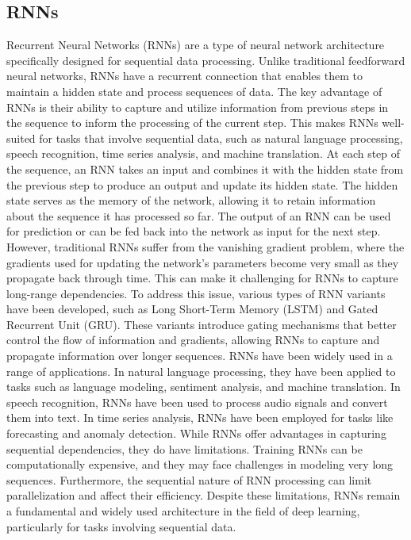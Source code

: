 \subsection{RNNs}
Recurrent Neural Networks (RNNs) are a type of neural network architecture specifically designed for sequential data processing. Unlike traditional feedforward neural networks, RNNs have a recurrent connection that enables them to maintain a hidden state and process sequences of data.
The key advantage of RNNs is their ability to capture and utilize information from previous steps in the sequence to inform the processing of the current step. This makes RNNs well-suited for tasks that involve sequential data, such as natural language processing, speech recognition, time series analysis, and machine translation.
At each step of the sequence, an RNN takes an input and combines it with the hidden state from the previous step to produce an output and update its hidden state. The hidden state serves as the memory of the network, allowing it to retain information about the sequence it has processed so far. The output of an RNN can be used for prediction or can be fed back into the network as input for the next step.
However, traditional RNNs suffer from the vanishing gradient problem, where the gradients used for updating the network's parameters become very small as they propagate back through time. This can make it challenging for RNNs to capture long-range dependencies. To address this issue, various types of RNN variants have been developed, such as Long Short-Term Memory (LSTM) and Gated Recurrent Unit (GRU). These variants introduce gating mechanisms that better control the flow of information and gradients, allowing RNNs to capture and propagate information over longer sequences.
RNNs have been widely used in a range of applications. In natural language processing, they have been applied to tasks such as language modeling, sentiment analysis, and machine translation. In speech recognition, RNNs have been used to process audio signals and convert them into text. In time series analysis, RNNs have been employed for tasks like forecasting and anomaly detection.
While RNNs offer advantages in capturing sequential dependencies, they do have limitations. Training RNNs can be computationally expensive, and they may face challenges in modeling very long sequences. Furthermore, the sequential nature of RNN processing can limit parallelization and affect their efficiency.
Despite these limitations, RNNs remain a fundamental and widely used architecture in the field of deep learning, particularly for tasks involving sequential data.
